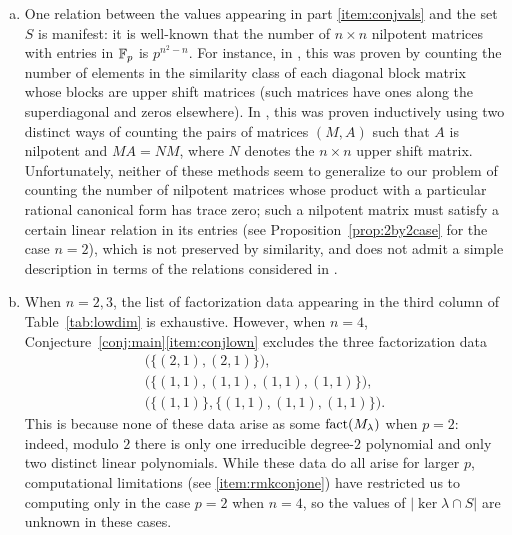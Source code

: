 \begin{rem}
\begin{enumerate}[(a)]
\item One relation between the values appearing in part \eqref{item:conjvals} and the set $S$ is manifest: it is well-known that the number of $n\times n$ nilpotent matrices with entries in $\mathbb{F}_p$ is $p^{n^2-n}$. For instance, in \cite{fine}, this was proven by counting the number of elements in the similarity class of each diagonal block matrix whose blocks are upper shift matrices (such matrices have ones along the superdiagonal and zeros elsewhere). In \cite{gerstenhaber}, this was proven inductively using two distinct ways of counting the pairs of matrices $(M,A)$ such that $A$ is nilpotent and $MA=NM$, where $N$ denotes the $n\times n$ upper shift matrix. Unfortunately, neither of these methods seem to generalize to our problem of counting the number of nilpotent matrices whose product with a particular rational canonical form has trace zero; such a nilpotent matrix must satisfy a certain linear relation in its entries (see Proposition~\ref{prop:2by2case} for the case $n=2$), which is not preserved by similarity, and does not admit a simple description in terms of the relations considered in \cite{gerstenhaber}.\label{item:rmkconjnum}

\item When $n=2,3$, the list of factorization data appearing in the third column of Table~\ref{tab:lowdim} is exhaustive. However, when $n=4$, Conjecture~\ref{conj:main}\eqref{item:conjlown} excludes the three factorization data
\begin{gather*}
\Big(\big\{(2,1),(2,1)\big\}\Big),\\
\Big(\big\{(1,1),(1,1),(1,1),(1,1)\big\}\Big),\\
\Big(\big\{(1,1)\big\},\big\{(1,1),(1,1),(1,1)\big\}\Big).
\end{gather*}
This is because none of these data arise as some $\operatorname{fact}(M_\lambda)$ when $p=2$: indeed, modulo $2$ there is only one irreducible degree-$2$ polynomial and only two distinct linear polynomials. While these data do all arise for larger $p$, computational limitations (see \eqref{item:rmkconjone}) have restricted us to computing only in the case $p=2$ when $n=4$, so the values of $|\ker\lambda\cap S|$ are unknown in these cases.\label{item:rmkconjtwo}


\end{enumerate}
\end{rem}
